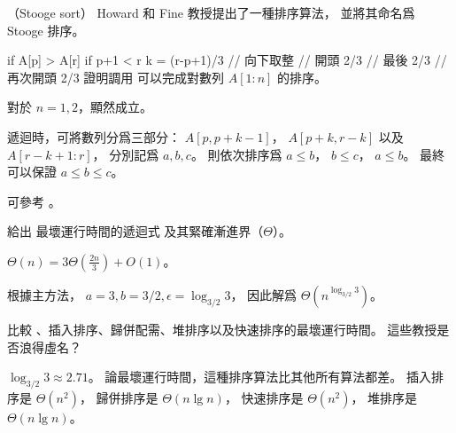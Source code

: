 \startPROBLEM
（Stooge sort）
Howard 和 Fine 教授提出了一種排序算法，
並將其命名爲 Stooge 排序。

\startCLRSCODE
if A[p] > A[r]
if p+1 < r
	k = \lfloor (r-p+1)/3 \rfloor	// 向下取整
		// 開頭 2/3
		// 最後 2/3
		// 再次開頭 2/3
\stopCLRSCODE
\startigBase[a]\startitem
證明調用  可以完成對數列 $A[1:n]$ 的排序。
\stopitem\stopigBase

\startANSWER
對於 $n=1,2$，顯然成立。

遞迴時，可將數列分爲三部分： $A[p,p+k-1]$， $A[p+k,r-k]$ 以及 $A[r-k+1:r]$，
分別記爲 $a,b,c$。
則依次排序爲 $a\le b$， $b\le c$， $a\le b$。
最終可以保證 $a\le b\le c$。

可參考 。
\stopANSWER

\startigBase[a,continue]\startitem
給出  最壞運行時間的遞迴式
及其緊確漸進界（$\Theta$）。
\stopitem\stopigBase

\startANSWER
$\Theta(n)=3\Theta(\frac{2n}{3}) + O(1)$。

根據主方法， $a=3,b=3/2,\epsilon=\log_{3/2}3$，
因此解爲 $\Theta(n^{\log_{3/2}3})$。
\stopANSWER

\startigBase[a,continue]\startitem
比較 、插入排序、歸併配需、堆排序以及快速排序的最壞運行時間。
這些教授是否浪得虛名？
\stopitem\stopigBase

\startANSWER
$\log_{3/2}3\approx 2.71$。
論最壞運行時間，這種排序算法比其他所有算法都差。
插入排序是 $\Theta(n^2)$，
歸併排序是 $\Theta(n\lg n)$，
快速排序是 $\Theta(n^2)$，
堆排序是 $\Theta(n\lg n)$。
\stopANSWER

\stopPROBLEM
